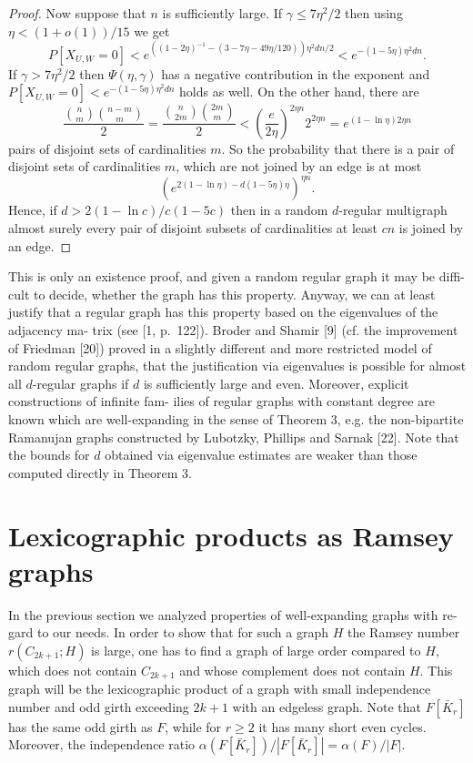 \documentclass[12pt,a4paper]{article}
\begin{document}
\begin{proof}
Now suppose that $n$ is sufficiently large. If $\gamma\le 7\eta^2/2$ then using $\eta<(1+o(1))/15$
we get
\[
  P[X_{U,W}=0]<e^{((1-2\eta)^{-1}-(3-7\eta-49\eta/120))\eta^2dn/2}<e^{-(1-5\eta)\eta^2dn}.
\]
If $\gamma>7\eta^2/2$ then $\Psi(\eta,\gamma)$ has a negative contribution in the exponent and $P[X_{U,W}=
0]<e^{-(1-5\eta)\eta^2dn}$ holds as well. On the other hand, there are
\[
  \frac{\binom{n}{m}\binom{n-m}{m}}{2}=\frac{\binom{n}{2m}\binom{2m}{m}}{2}<\left(\frac{e}{2\eta}\right)^{2\eta n}2^{2\eta n}=e^{(1-\ln\eta)2\eta n}
\]
pairs of disjoint sets of cardinalities $m$. So the probability that there is a pair of
disjoint sets of cardinalities $m$, which are not joined by an edge is at most
\[
  \left(e^{2(1-\ln\eta)-d(1-5\eta)\eta}\right)^{\eta n}.
\]
Hence, if $d>2(1-\ln c)/c(1-5c)$ then in a random $d$-regular multigraph almost
surely every pair of disjoint subsets of cardinalities at least $cn$ is joined by an edge.
\end{proof}

This is only an existence proof, and given a random regular graph it may be diffi-
cult to decide, whether the graph has this property. Anyway, we can at least justify
that a regular graph has this property based on the eigenvalues of the adjacency ma-
trix (see [1, p.~122]). Broder and Shamir [9] (cf. the improvement of Friedman [20])
proved in a slightly different and more restricted model of random regular graphs,
that the justification via eigenvalues is possible for almost all $d$-regular graphs if
$d$ is sufficiently large and even. Moreover, explicit constructions of infinite fam-
ilies of regular graphs with constant degree are known which are well-expanding
in the sense of Theorem 3, e.g. the non-bipartite Ramanujan graphs constructed
by Lubotzky, Phillips and Sarnak [22]. Note that the bounds for $d$ obtained via
eigenvalue estimates are weaker than those computed directly in Theorem 3.

\section{Lexicographic products as Ramsey graphs}

In the previous section we analyzed properties of well-expanding graphs with re-
gard to our needs. In order to show that for such a graph $H$ the Ramsey number
$r(C_{2k+1};H)$ is large, one has to find a graph of large order compared to $H$, which
does not contain $C_{2k+1}$ and whose complement does not contain $H$. This graph
will be the lexicographic product of a graph with small independence number and
odd girth exceeding $2k+1$ with an edgeless graph. Note that $F[\bar{K}_r]$ has the same
odd girth as $F$, while for $r\ge 2$ it has many short even cycles. Moreover, the
independence ratio $\alpha(F[\bar{K}_r])/|F[\bar{K}_r]|=\alpha(F)/|F|$.
\end{document}

